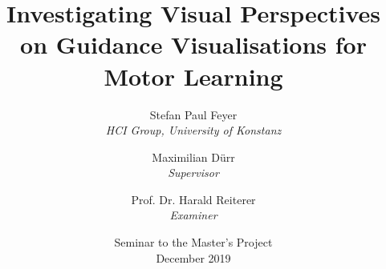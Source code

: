 \documentclass[12pt,a4paper,twoside,titlepage]{memoir}
\title{Investigating Visual Perspectives on Guidance Visualisations for Motor Learning}
\author{Stefan Paul Feyer\\
	\textit{HCI Group, University of Konstanz}
	\and
	Maximilian Dürr\\
	\textit{Supervisor}
	\and
	Prof. Dr. Harald Reiterer\\
	\textit{Examiner}
}
\date{Seminar to the Master's Project \\December 2019}
\begin{document}
	\maketitle
	\thispagestyle{empty}
	\frontmatter
	
	\begin{KeepFromToc}
		\tableofcontents
	\end{KeepFromToc}
	\listoffigures
	\listoftables
	\mainmatter
	
	
	
	
	
	
	
\end{document}
